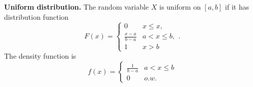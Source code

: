 \begin{example}
\textbf{Uniform distribution.} The random variable $X$ is uniform on $[a, b]$ if it has distribution function
\begin{equation*}
    F(x) = \begin{cases} 
        0 & x \leq x, \\ \frac{x-a}{b-a} & a < x \leq b, \\ 1 & x > b
    \end{cases}.
\end{equation*}
The density function is
\begin{equation*}
    f(x) = \begin{cases} \frac{1}{b-a} & a < x \leq b \\ 0 & o.w. \end{cases}
\end{equation*}
\end{example}


